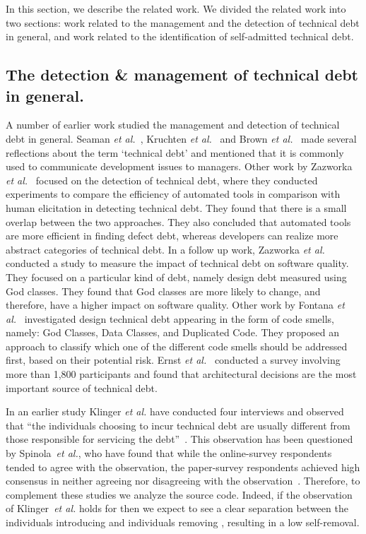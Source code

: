 In this section, we describe the related work. We divided the related work into two sections: work related to the management and the detection of technical debt in general, and work related to the identification of self-admitted technical debt.

\subsection{The detection \& management of technical debt in general.} A number of earlier work studied the management and detection of technical debt in general. Seaman \textit{et al.}~\cite{Seaman2011}, Kruchten \textit{et al.}~\cite{Kruchten2013IWMTD} and Brown \textit{et al.}~\cite{Brown2010MTD} made several reflections about the term `technical debt' and mentioned that it is commonly used to communicate development issues to managers. Other work by Zazworka \textit{et al.}~\cite{Zazworka2013EASE} focused on the detection of technical debt, where they conducted experiments to compare the efficiency of automated tools in comparison with human elicitation in detecting technical debt. They found that there is a small overlap between the two approaches. They also concluded that automated tools are more efficient in finding defect debt, whereas developers can realize more abstract categories of technical debt. In a follow up work, Zazworka \textit{et al.}~\cite{Zazworka2011MTD} conducted a study to measure the impact of technical debt on software quality. They focused on a particular kind of debt, namely design debt measured using God classes. They found that God classes are more likely to change, and therefore, have a higher impact on software quality. Other work by Fontana \textit{et al.}~\cite{Fontana2012MTD} investigated design technical debt appearing in the form of code smells, namely: God Classes, Data Classes, and Duplicated Code. They proposed an approach to classify which one of the different code smells should be addressed first, based on their potential risk. Ernst \textit{et al.}~\cite{Ernst2015FSE} conducted a survey involving more than 1,800 participants and found that architectural decisions are the most important source of technical debt.



In an earlier study Klinger \textit{et al.} have conducted four interviews and observed that ``the individuals choosing to incur technical debt are usually different from those responsible for servicing the debt''~\cite{Klinger:etal}. 
This observation has been questioned by Spinola~\textit{et al.}, who have found that while the online-survey respondents tended to agree with the observation, the paper-survey respondents achieved high consensus in neither agreeing nor disagreeing with the observation~\cite{Spinola:etal}. Therefore, to complement these studies we analyze the source code.
Indeed, if the observation of Klinger~\textit{et al.} holds for \SATD then we expect to see a clear separation between the individuals introducing \SATD and individuals removing \SATD, resulting in a low \SATD self-removal.

